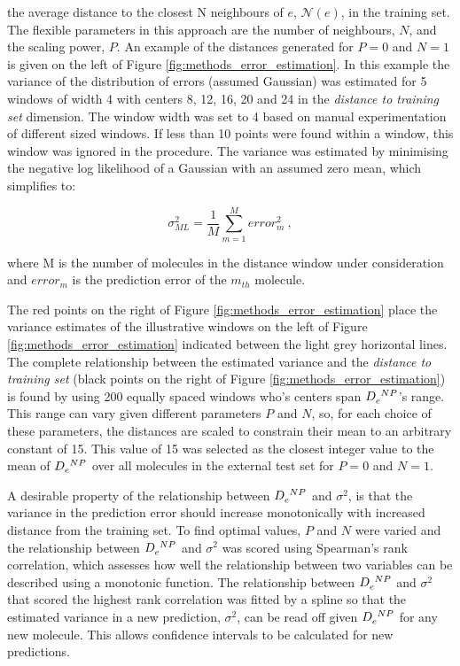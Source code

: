 \documentclass[10pt]{bmc_article}
\newenvironment{bmcformat}{\begin{raggedright}\baselineskip20pt\sloppy\setboolean{publ}{false}}{\end{raggedright}\baselineskip20pt\sloppy}
\begin{document}
\begin{bmcformat}

the average distance to the closest N neighbours of $e$, $\mathcal{N}(e)$, in the training set. The flexible parameters in this approach are the number of neighbours, $N$, and the scaling power, $P$. An example of the distances generated for $P=0$ and $N=1$ is given on the left of Figure \ref{fig:methods_error_estimation}. In this example the variance of the distribution of errors (assumed Gaussian) was estimated for 5 windows of width 4 with centers 8, 12, 16, 20 and 24 in the \textit{distance to training set} dimension. The window width was set to 4 based on manual experimentation of different sized windows. If less than 10 points were found within a window, this window was ignored in the procedure. The variance was estimated by minimising the negative log likelihood of a Gaussian with an assumed zero mean, which simplifies to: 

\begin{equation}
\sigma^2_{ML} = \frac{1}{M} \sum_{m=1}^{M}{error_m^2}\ ,
\end{equation}

where M is the number of molecules in the distance window under consideration and $error_m$ is the prediction error of the $m_{th}$ molecule. 

The red points on the right of Figure \ref{fig:methods_error_estimation} place the variance estimates of the illustrative windows on the left of Figure \ref{fig:methods_error_estimation} indicated between the light grey horizontal lines. The complete relationship between the estimated variance and the \textit{distance to training set} (black points on the right of Figure \ref{fig:methods_error_estimation}) is found by using 200 equally spaced windows who's centers span $\tensor{D}{_e^N^P}$'s range. This range can vary given different parameters $P$ and $N$, so, for each choice of these parameters, the distances are scaled to constrain their mean to an arbitrary constant of 15. This value of 15 was selected as the closest integer value to the mean of $\tensor{D}{_e^N^P}$ over all molecules in the external test set for $P=0$ and $N=1$.

A desirable property of the relationship between $\tensor{D}{_e^N^P}$ and $\sigma^2$, is that the variance in the prediction error should increase monotonically with increased distance from the training set. To find optimal values, $P$ and $N$ were varied and the relationship between $\tensor{D}{_e^N^P}$ and $\sigma^2$ was scored using Spearman's rank correlation, which assesses how well the relationship between two variables can be described using a monotonic function. The relationship between $\tensor{D}{_e^N^P}$ and $\sigma^2$ that scored the highest rank correlation was fitted by a spline so that the estimated variance in a new prediction, $\sigma^2$, can be read off given $\tensor{D}{_e^N^P}$ for any new molecule. This allows confidence intervals to be calculated for new predictions.


\end{bmcformat}
\end{document}
